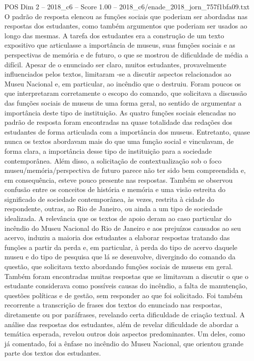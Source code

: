 \begin{textsample}{POS Dim 2 – 2018\_c6 – Score 1.00 – 2018\_c6/enade\_2018\_jorn\_757f1bfa09.txt}
O padrão de resposta elencou as funções sociais que poderiam ser abordadas nas respostas dos estudantes, como também argumentos que poderiam ser usados ao longo das mesmas.
A tarefa dos estudantes era a construção de um texto expositivo que articulasse a importância de museus, suas funções sociais e as perspectivas de memória e de futuro, o que se mostrou de dificuldade de média a difícil.
Apesar de o enunciado ser claro, muitos estudantes, provavelmente influenciados pelos textos, limitaram -se a discutir aspectos relacionados ao Museu Nacional e, em particular, ao incêndio que o destruiu.
Foram poucos os que interpretaram corretamente o escopo do comando, que solicitava a discussão das funções sociais de museus de uma forma geral, no sentido de argumentar a importância deste tipo de instituição.
As quatro funções sociais elencadas no padrão de resposta foram encontradas na quase totalidade das redações dos estudantes de forma articulada com a importância dos museus.
Entretanto, quase nunca os textos abordavam mais do que uma função social e vinculavam, de forma clara, a importância desse tipo de instituição para a sociedade contemporânea.
Além disso, a solicitação de contextualização sob o foco museu/memória/perspectiva de futuro parece não ter sido bem compreendida e, em consequência, esteve pouco presente nas respostas.
Também se observou confusão entre os conceitos de história e memória e uma visão estreita do significado de sociedade contemporânea, às vezes, restrita à cidade do respondente, outras, ao Rio de Janeiro, ou ainda a um tipo de sociedade idealizada.
A relevância que os textos de apoio deram ao caso particular do incêndio do Museu Nacional do Rio de Janeiro e aos prejuízos causados ao seu acervo, induziu a maioria dos estudantes a elaborar respostas tratando das funções a partir da perda e, em particular, à perda do tipo de acervo daquele museu e do tipo de pesquisa que lá se desenvolve, divergindo do comando da questão, que solicitava texto abordando funções sociais de museus em geral.
Também foram encontradas muitas respostas que se limitavam a discutir o que o estudante considerava como possíveis causas do incêndio, a falta de manutenção, questões políticas e de gestão, sem responder ao que foi solicitado.
Foi também recorrente a transcrição de frases dos textos do enunciado nas respostas, diretamente ou por paráfrases, revelando certa dificuldade de criação textual.
A análise das respostas dos estudantes, além de revelar dificuldade de abordar a temática esperada, revelou outros dois aspectos predominantes.
Um deles, como já comentado, foi a ênfase no incêndio do Museu Nacional, que orientou grande parte dos textos dos estudantes.

\end{textsample}
